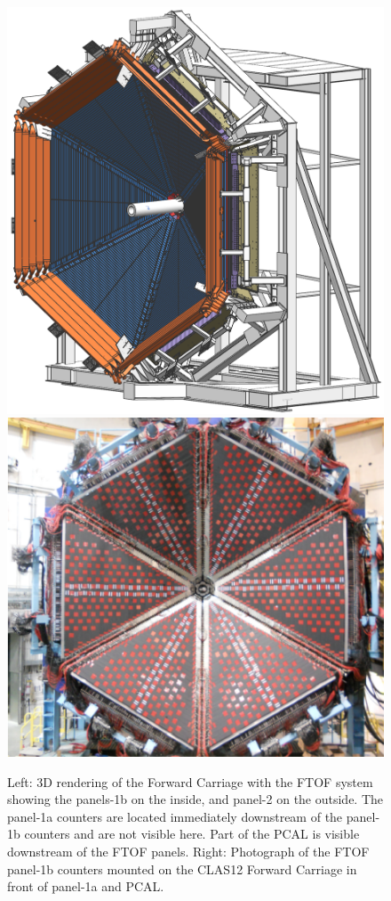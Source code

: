 \documentclass[final,3p,twocolumn]{elsarticle}
\begin{document}
\begin{figure}[htbp!]
\hspace{0.3cm}\includegraphics[width=0.95\columnwidth]{fwd_carriage-1.png}
\hspace{0.3cm}\includegraphics[width=1.0\columnwidth]{FTOF-1b.png}
\caption{Left: 3D rendering of the Forward Carriage with the FTOF system showing the panels-1b on the inside, and panel-2
on the outside. The panel-1a counters are located immediately downstream of the panel-1b counters and are not visible here.
Part of the PCAL is visible downstream of the FTOF panels. Right: Photograph of the FTOF panel-1b counters mounted on the
CLAS12 Forward Carriage in front of panel-1a and PCAL.} 
\label{ftof-1b}
\end{figure}
\end{document}
